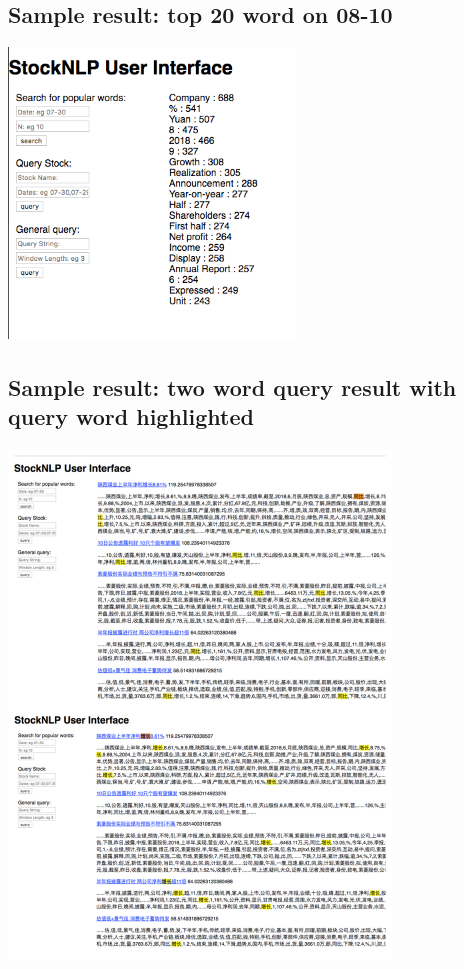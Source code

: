 \documentclass{article}
\begin{document}
\subsection{Sample result: top 20 word on 08-10}
\includegraphics[width=3in]{08-09-top20-words-en} 
\subsection{Sample result: two word query result with query word highlighted}
\includegraphics[width=4in]{query-with-heighlight}
\end{document}
